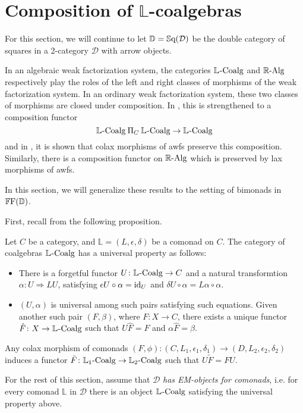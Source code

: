 
\chapter{Composition of $\mathbb{L}$-coalgebras}

For this section, we will continue to let $\mathbb{D}=\Sq(\mathcal{D})$ be the double category of squares in a 2-category $\mathcal{D}$ with arrow objects.

In an algebraic weak factorization system, the categories $\LCoalg$ and $\RAlg$ respectively play the roles of the left and right classes of morphisms of the weak factorization system. In an ordinary weak factorization system, these two classes of morphisms are closed under composition. In \cite{garner:soa}, this is strengthened to a composition functor
\[
	\LCoalg \prodb_C \LCoalg \to \LCoalg
\]
and in \cite{riehl:nwfs-model}, it is shown that colax morphisms of awfs preserve this composition. Similarly, there is a composition functor on $\RAlg$ which is preserved by lax morphisms of awfs.

In this section, we will generalize these results to the setting of bimonads in $\FFD$.

First, recall from \cite{street:ftm} the following proposition.

\begin{proposition}\label{Prop:EMObject}
	Let $C$ be a category, and $\mathbb{L}=(L,\epsilon,\delta)$ be a comonad on $C$. The category of coalgebras $\LCoalg$ has a universal property as follows:
	\begin{itemize}
	 	\item There is a forgetful functor $U\colon \LCoalg \to C$ and a natural transformtion $\alpha\colon U \Rightarrow LU$, satisfying $\epsilon U\circ\alpha = \id_U$ and $\delta U \circ \alpha = L\alpha\circ\alpha$.
	 	\item $(U,\alpha)$ is universal among such pairs satisfying such equations. Given another such pair $(F,\beta)$, where $F\colon X\to C$, there exists a unique functor $\hat{F}\colon X\to \LCoalg$ such that $U\hat{F}=F$ and $\alpha\hat{F}=\beta$.
	 \end{itemize}
	 Any colax morphism of comonads $(F,\phi)\colon(C,L_1,\epsilon_1,\delta_1)\to(D,L_2,\epsilon_2,\delta_2)$ induces a functor $\tilde{F}\colon\LCoalg[1]\to\LCoalg[2]$ such that $U\tilde{F}=FU$.
\end{proposition}

For the rest of this section, assume that $\mathcal{D}$ \emph{has EM-objects for comonads}, i.e. for every comonad $\mathbb{L}$ in $\mathcal{D}$ there is an object $\LCoalg$ satisfying the universal property above.

